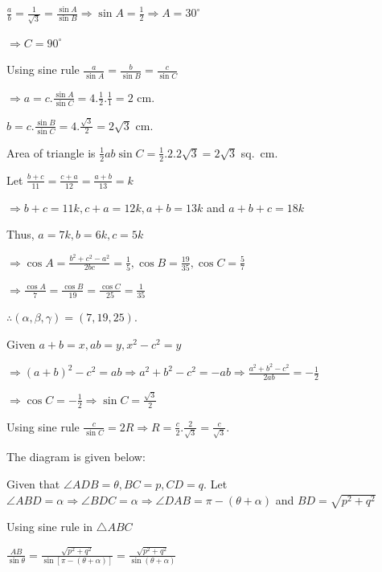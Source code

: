   $\frac{a}{b} = \frac{1}{\sqrt{3}} = \frac{\sin A}{\sin B}\Rightarrow \sin A = \frac{1}{2} \Rightarrow A =
  30^\circ$

  $\Rightarrow C = 90^\circ$

  Using sine rule $\frac{a}{\sin A} = \frac{b}{\sin B} = \frac{c}{\sin C}$

  $\Rightarrow a = c.\frac{\sin A}{\sin C} = 4.\frac{1}{2}.\frac{1}{1} = 2$ cm.

  $b = c.\frac{\sin B}{\sin C} = 4.\frac{\sqrt{3}}{2} = 2\sqrt{3}$ cm.

  Area of triangle is $\frac{1}{2}ab\sin C = \frac{1}{2}.2.2\sqrt{3} = 2\sqrt{3}$ sq.\ cm.
\item Let $\frac{b + c}{11} = \frac{c + a}{12} = \frac{a + b}{13} = k$

  $\Rightarrow b + c = 11k, c + a = 12k, a + b = 13k$ and $a + b + c = 18k$

  Thus, $a = 7k, b = 6k, c = 5k$

  $\Rightarrow \cos A = \frac{b^2 + c^2 - a^2}{2bc} = \frac{1}{5}, \cos B = \frac{19}{35}, \cos C
  = \frac{5}{7}$

  $\Rightarrow \frac{\cos A}{7} = \frac{\cos B}{19} = \frac{\cos C}{25} = \frac{1}{35}$

  $\therefore (\alpha, \beta, \gamma) = (7, 19, 25)$.
\item Given $a + b = x, ab = y, x^2 - c^2 = y$

  $\Rightarrow (a + b)^2 - c^2 = ab \Rightarrow a^2 + b^2 - c^2 = -ab \Rightarrow \frac{a^2 + b^2 -
  c^2}{2ab} = -\frac{1}{2}$

  $\Rightarrow \cos C = -\frac{1}{2}\Rightarrow \sin C = \frac{\sqrt{3}}{2}$

  Using sine rule $\frac{c}{\sin C} = 2R \Rightarrow R = \frac{c}{2}.\frac{2}{\sqrt{3}}
  = \frac{c}{\sqrt{3}}$.
\item The diagram is given below:

  \startplacefigure
    \externalfigure[17_12.pdf]
  \stopplacefigure

  Given that $\angle ADB = \theta, BC = p, CD = q$. Let $\angle ABD = \alpha \Rightarrow \angle BDC
  = \alpha\Rightarrow \angle DAB = \pi - (\theta + \alpha)$ and $BD = \sqrt{p^2 + q^2}$

  Using sine rule in $\triangle ABC$

  $\frac{AB}{\sin\theta} = \frac{\sqrt{p^2 + q^2}}{\sin[\pi - (\theta + \alpha)]} = \frac{\sqrt{p^2 +
      q^2}}{\sin(\theta + \alpha)}$

